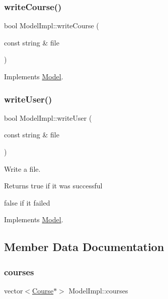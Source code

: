 \subsubsection{\texorpdfstring{write\+Course()}{writeCourse()}}
{\footnotesize\ttfamily bool Model\+Impl\+::write\+Course (\begin{DoxyParamCaption}\item[{const string \&}]{file }\end{DoxyParamCaption})\hspace{0.3cm}{\ttfamily [virtual]}}



Implements \hyperlink{classModel_a4e75d78a6dc3ded41a44475c3d59aa57}{Model}.

\mbox{\label{classModelImpl_a42b5948a513af3e20645cdb63fb6be76}} 
\subsubsection{\texorpdfstring{write\+User()}{writeUser()}}
{\footnotesize\ttfamily bool Model\+Impl\+::write\+User (\begin{DoxyParamCaption}\item[{const string \&}]{file }\end{DoxyParamCaption})\hspace{0.3cm}{\ttfamily [virtual]}}



Write a file. 

\begin{DoxyReturn}{Returns}
true if it was successful 

false if it failed 
\end{DoxyReturn}


Implements \hyperlink{classModel_ad2d1b50c1c071ad0b7820cf4343b2463}{Model}.



\subsection{Member Data Documentation}
\mbox{\label{classModelImpl_aa724c97a6f6614f92546e2332a0eb25c}} 
\subsubsection{\texorpdfstring{courses}{courses}}
{\footnotesize\ttfamily vector$<$\hyperlink{classCourse}{Course}$\ast$$>$ Model\+Impl\+::courses\hspace{0.3cm}{\ttfamily [protected]}}

